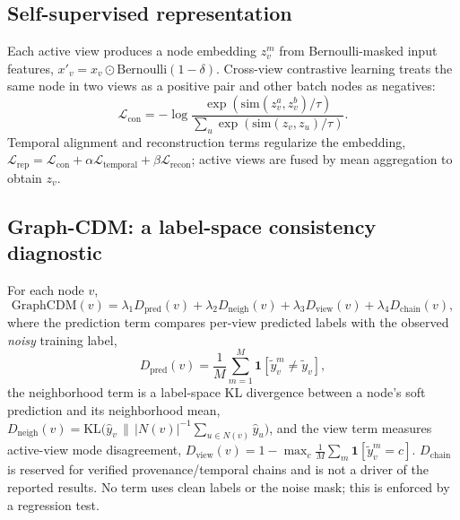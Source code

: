 \documentclass[preprint,3p,times]{elsarticle}
\begin{document}
\subsection{Self-supervised representation}
Each active view produces a node embedding $z_v^{m}$ from Bernoulli-masked input
features, $x'_v = x_v \odot \mathrm{Bernoulli}(1-\delta)$. Cross-view contrastive
learning treats the same node in two views as a positive pair and other batch
nodes as negatives:
\begin{equation}
\mathcal{L}_{\text{con}} = -\log
\frac{\exp(\mathrm{sim}(z^{a}_v,z^{b}_v)/\tau)}
{\sum_{u}\exp(\mathrm{sim}(z_v,z_u)/\tau)} .
\end{equation}
Temporal alignment and reconstruction terms regularize the embedding,
$\mathcal{L}_{\text{rep}}=\mathcal{L}_{\text{con}}+\alpha\mathcal{L}_{\text{temporal}}
+\beta\mathcal{L}_{\text{recon}}$; active views are fused by mean aggregation to
obtain $z_v$.

\subsection{Graph-CDM: a label-space consistency diagnostic}
For each node $v$,
\begin{equation}
\mathrm{GraphCDM}(v)=\lambda_1 D_{\text{pred}}(v)+\lambda_2 D_{\text{neigh}}(v)
+\lambda_3 D_{\text{view}}(v)+\lambda_4 D_{\text{chain}}(v),
\end{equation}
where the prediction term compares per-view predicted labels with the observed
\emph{noisy} training label,
\begin{equation}
D_{\text{pred}}(v)=\frac{1}{M}\sum_{m=1}^{M}\mathbf{1}[\tilde{y}^{m}_v\neq \tilde{y}_v],
\end{equation}
the neighborhood term is a label-space KL divergence between a node's soft
prediction and its neighborhood mean,
$D_{\text{neigh}}(v)=\mathrm{KL}\!\big(\hat{y}_v \,\|\,
|N(v)|^{-1}\sum_{u\in N(v)}\hat{y}_u\big)$,
and the view term measures active-view mode disagreement,
$D_{\text{view}}(v)=1-\max_c\frac1M\sum_m\mathbf{1}[\tilde{y}^{m}_v=c]$.
$D_{\text{chain}}$ is reserved for verified provenance/temporal chains and is not a
driver of the reported results. No term uses clean labels or the noise mask;
this is enforced by a regression test.
\end{document}
